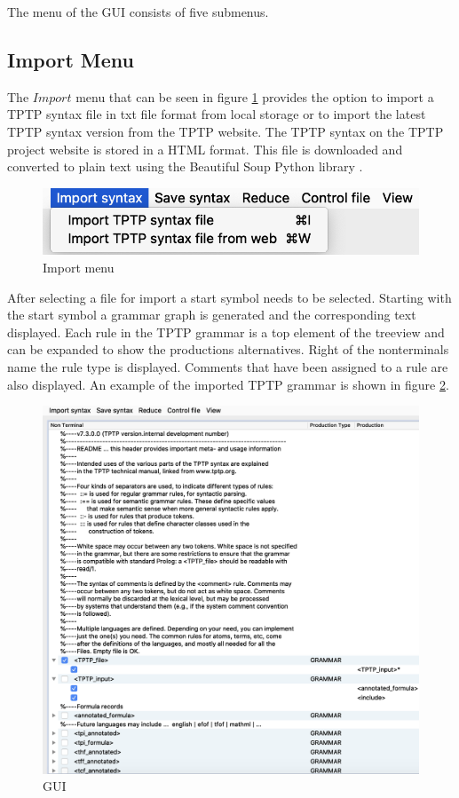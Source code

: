 The menu of the GUI consists of five submenus.

\subsection{Import Menu}\label{sec:ConceptGUIImportMenu}

The $Import$ menu that can be seen in figure \ref{fig:import} provides the option to import a \ac{TPTP} syntax file in txt file format from local storage or to import the latest \ac{TPTP} syntax version from the \ac{TPTP} website.
The \ac{TPTP} syntax on the \ac{TPTP} project website is stored in a HTML format.
This file is downloaded and converted to plain text using the Beautiful Soup Python library \cite{BeautifulSoup}.

\begin{figure}[H]
\centering
\includegraphics[width=.7\textwidth]{images/import.png}
\caption{Import menu}
\label{fig:import}
\end{figure}

After selecting a file for import a start symbol needs to be selected.
Starting with the start symbol a grammar graph is generated and the corresponding text displayed.
Each rule in the \ac{TPTP} grammar is a top element of the treeview and can be expanded to show the productions alternatives.
Right of the nonterminals name the rule type is displayed.
Comments that have been assigned to a rule are also displayed. An example of the imported \ac{TPTP} grammar is shown in figure \ref{fig:gui}.

\begin{figure}[H]
\centering
\includegraphics[width=1\textwidth]{images/gui.png}
\caption{GUI}
\label{fig:gui}
\end{figure}

